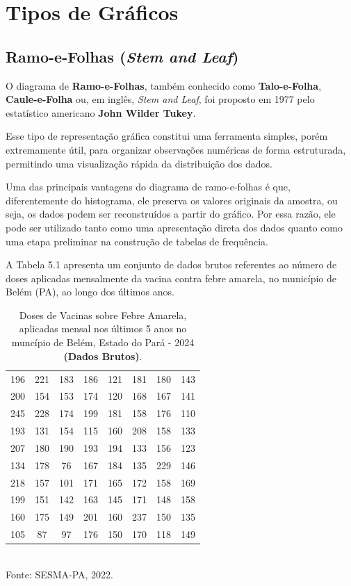 \newpage
\section{Tipos de Gráficos}
\subsection{Ramo-e-Folhas (\textit{Stem and Leaf})}

O diagrama de \textbf{Ramo-e-Folhas}, também conhecido como
\textbf{Talo-e-Folha}, \textbf{Caule-e-Folha} ou, em inglês,
\textit{Stem and Leaf}, foi proposto em 1977 pelo estatístico
americano \textbf{John Wilder Tukey}.  \vskip0.3cm

Esse tipo de representação gráfica constitui uma ferramenta simples,
porém extremamente útil, para organizar observações numéricas de forma
estruturada, permitindo uma visualização rápida da distribuição dos dados. \vskip0.3cm

Uma das principais vantagens do diagrama de ramo-e-folhas é que,
diferentemente do histograma, ele preserva os valores originais da amostra,
ou seja, os dados podem ser reconstruídos a partir do gráfico.
Por essa razão, ele pode ser utilizado tanto como uma apresentação direta
dos dados quanto como uma etapa preliminar na construção de tabelas de frequência. \vskip0.3cm

A Tabela 5.1 apresenta um conjunto de dados brutos referentes
ao número de doses aplicadas mensalmente da vacina contra febre amarela,
no município de Belém (PA), ao longo dos últimos anos.


\begin{table}[H]
    \centering
    {
\caption{Doses de Vacinas sobre Febre Amarela, aplicadas mensal nos últimos 5 anos no muncípio de Belém, Estado do Pará - 2024 \textbf{(Dados Brutos)}.}
    \label{febreamarela}
    \vspace{0.1cm}
\begin{tabular}{c|c|c|c|c|c|c|c}
  \hline \hline
  196 & 221 & 183 & 186 & 121 & 181 & 180 & 143  \\
  200 & 154 & 153 & 174 & 120 & 168 & 167 & 141  \\
  245 & 228 & 174 & 199 & 181 & 158 & 176 & 110  \\
  193 & 131 & 154 & 115 & 160 & 208 & 158 & 133  \\
  207 & 180 & 190 & 193 & 194 & 133 & 156 & 123  \\
  134 & 178 &  76 & 167 & 184 & 135 & 229 & 146  \\
  218 & 157 & 101 & 171 & 165 & 172 & 158 & 169  \\
  199 & 151 & 142 & 163 & 145 & 171 & 148 & 158  \\
  160 & 175 & 149 & 201 & 160 & 237 & 150 & 135  \\
  105 & 87  & 97  & 176 & 150 & 170 & 118 & 149  \\
\hline \hline
\end{tabular}}
\\
\hspace{-3.5cm} Fonte: SESMA-PA, 2022.
\end{table}


